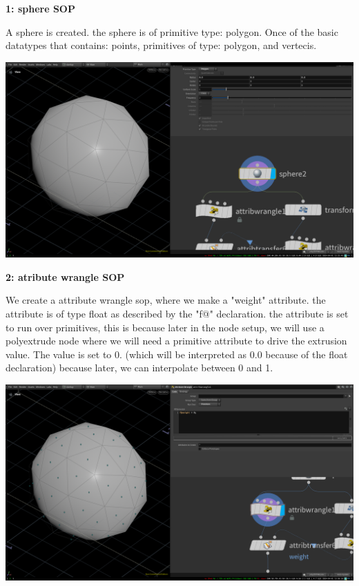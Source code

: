 \documentclass[11pt, a4paper, twoside]{article}
\begin{document}
	\begin{minipage}[H!]{0.4\textwidth}
		\textbf{1: sphere SOP} \newline 

A sphere is created. the sphere is
of primitive type: polygon. Once of the basic datatypes that contains: points,
primitives of type: polygon, and vertecis.  

	\end{minipage}
	\vspace{1pt}
	\begin{minipage}[H]{0.6\textwidth}
		\includegraphics[width=1\textwidth]{media/houdini_fundamentals_1.png}
	\end{minipage}



	\begin{minipage}[H]{0.4\textwidth}
		\textbf{2: atribute wrangle SOP}\newline 

We create a attribute wrangle sop, where we make a "weight" attribute. the
attribute is of type float as described by the "f@" declaration. the attribute
is set to run over primitives, this is because later in the node setup, we will
use a polyextrude node where we will need a primitive attribute to drive the
extrusion value. The value is set to 0. (which will be interpreted as 0.0
because of the float declaration) because later, we can interpolate between 0
and 1. 
	
	 \end{minipage}
	\vspace{1pt}
	\begin{minipage}[H]{0.6\textwidth}
		\includegraphics[width=1\textwidth]{media/houdini_fundamentals_2.png}
	\end{minipage}
\end{document}
